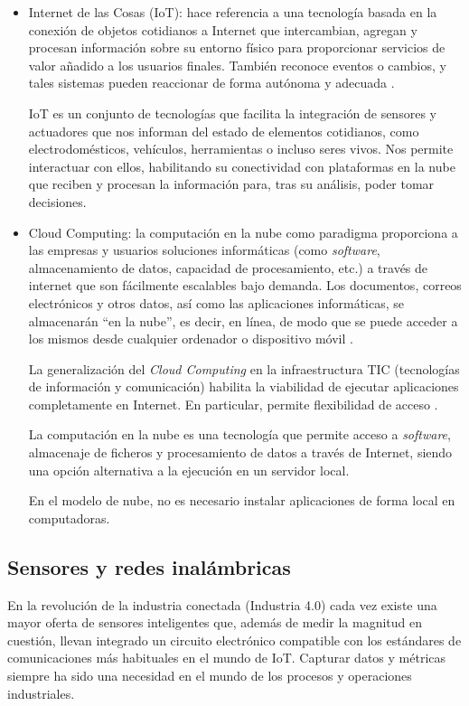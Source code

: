 \begin{itemize}
\item Internet de las Cosas (IoT): hace referencia a una tecnología basada en la conexión de objetos cotidianos a Internet que intercambian, agregan y procesan información sobre su entorno físico para proporcionar servicios de valor añadido a los usuarios finales. También reconoce eventos o cambios, y tales sistemas pueden reaccionar de forma autónoma y adecuada \citep{BOOK:1}.

IoT es un conjunto de tecnologías que facilita la integración de sensores y actuadores que nos informan del estado de elementos cotidianos, como electrodomésticos, vehículos, herramientas o incluso seres vivos. Nos permite interactuar con ellos, habilitando su conectividad con plataformas en la nube que reciben y procesan la información para, tras su análisis, poder tomar decisiones.

\item Cloud Computing: la computación en la nube como paradigma proporciona a las empresas y usuarios soluciones informáticas (como \emph{software}, almacenamiento de datos, capacidad de procesamiento, etc.) a través de internet que son fácilmente escalables bajo demanda. Los documentos, correos electrónicos y otros datos, así como las aplicaciones informáticas, se almacenarán ``en la nube'', es decir, en línea, de modo que se puede acceder a los mismos desde cualquier ordenador o dispositivo móvil \citep{BOOK:1}.

La generalización del \emph{Cloud Computing} en la infraestructura TIC (tecnologías de información y comunicación) habilita la viabilidad de ejecutar aplicaciones completamente en Internet. En particular, permite flexibilidad de acceso \citep{BOOK:1}.

La computación en la nube es una tecnología que permite acceso a \emph{software}, almacenaje de ficheros y procesamiento de datos a través de Internet, siendo una opción alternativa a la ejecución en un servidor local. 

En el modelo de nube, no es necesario instalar aplicaciones de forma local en computadoras.

\end{itemize}

\subsection{Sensores y redes inalámbricas}

En la revolución de la industria conectada (Industria 4.0) cada vez existe una mayor oferta de sensores inteligentes que, además de medir la magnitud en cuestión, llevan integrado un circuito electrónico compatible con los estándares de comunicaciones más habituales en el mundo de IoT. Capturar datos y métricas siempre ha sido una necesidad en el mundo de los procesos y operaciones industriales.

